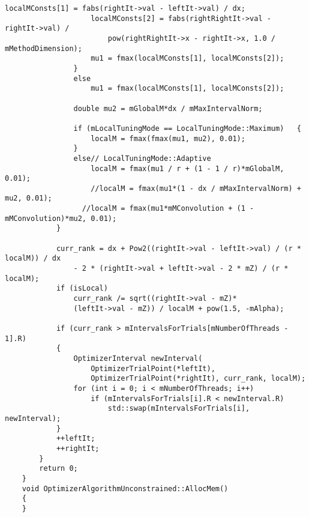 \begin{lstlisting}[frame=single]
					localMConsts[1] = fabs(rightIt->val - leftIt->val) / dx;
					localMConsts[2] = fabs(rightRightIt->val - rightIt->val) /
						pow(rightRightIt->x - rightIt->x, 1.0 / mMethodDimension);
					mu1 = fmax(localMConsts[1], localMConsts[2]);
				}
				else
					mu1 = fmax(localMConsts[1], localMConsts[2]);

				double mu2 = mGlobalM*dx / mMaxIntervalNorm;

				if (mLocalTuningMode == LocalTuningMode::Maximum)	{
					localM = fmax(fmax(mu1, mu2), 0.01);
				}
				else// LocalTuningMode::Adaptive
					localM = fmax(mu1 / r + (1 - 1 / r)*mGlobalM, 0.01);
					//localM = fmax(mu1*(1 - dx / mMaxIntervalNorm) + mu2, 0.01);
				  //localM = fmax(mu1*mMConvolution + (1 - mMConvolution)*mu2, 0.01);
			}

			curr_rank = dx + Pow2((rightIt->val - leftIt->val) / (r * localM)) / dx
				- 2 * (rightIt->val + leftIt->val - 2 * mZ) / (r * localM);
			if (isLocal)
				curr_rank /= sqrt((rightIt->val - mZ)*
				(leftIt->val - mZ)) / localM + pow(1.5, -mAlpha);

			if (curr_rank > mIntervalsForTrials[mNumberOfThreads - 1].R)
			{
				OptimizerInterval newInterval(
					OptimizerTrialPoint(*leftIt),
					OptimizerTrialPoint(*rightIt), curr_rank, localM);
				for (int i = 0; i < mNumberOfThreads; i++)
					if (mIntervalsForTrials[i].R < newInterval.R)
						std::swap(mIntervalsForTrials[i], newInterval);
			}
			++leftIt;
			++rightIt;
		}
		return 0;
	}
	void OptimizerAlgorithmUnconstrained::AllocMem()
	{
	}
\end{lstlisting}


